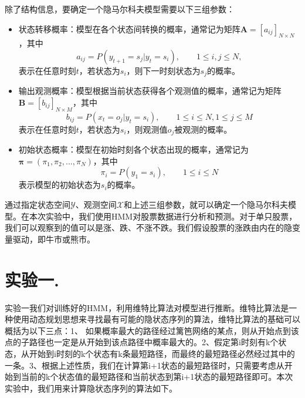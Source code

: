 \documentclass[a4paper,UTF8]{article}
\theoremstyle{definition}
\begin{document}
	除了结构信息，要确定一个隐马尔科夫模型需要以下三组参数：
\begin{itemize}
\item
	状态转移概率：模型在各个状态间转换的概率，通常记为矩阵$\textbf{A}=[a_{ij}]_{N\times N}$，其中
\begin{displaymath}
	a_{ij}=P(y_{t+1}=s_j|y_t=s_i),\qquad 1 \leq i,j \leq N,
\end{displaymath}
表示在任意时刻$t$，若状态为$s_i$，则下一时刻状态为$s_j$的概率。
\item
	输出观测概率：模型根据当前状态获得各个观测值的概率，通常记为矩阵$\textbf{B}=[b_{ij}]_{N\times M}$，其中
\begin{displaymath}
	b_{ij}=P(x_t=o_j|y_t=s_i),\qquad 1 \leq i \leq N, 1\leq j \leq M
\end{displaymath}
表示在任意时刻$t$，若状态为$s_i$，则观测值$o_j$被观测的概率。
\item
     初始状态概率：模型在初始时刻各个状态出现的概率，通常记为$\boldsymbol{\pi}=(\pi_1,\pi_2,...,\pi_N)$，其中
\begin{displaymath}
	\pi_i=P(y_1=s_i),\qquad 1\leq i \leq N
\end{displaymath}
表示模型的初始状态为$s_i$的概率。
\end{itemize}

	通过指定状态空间$\mathcal{Y}$、观测空间$\mathcal{X}$和上述三组参数，就可以确定一个隐马尔科夫模型。在本次实验中，我们使用HMM对股票数据进行分析和预测。对于单只股票，我们可以观察到的值可以是涨、跌、不涨不跌。我们假设股票的涨跌由内在的隐变量驱动，即牛市或熊市。

\section*{实验一.}
	实验一我们对训练好的HMM，利用维特比算法对模型进行推断。维特比算法是一种使用动态规划思想来寻找最有可能的隐状态序列的算法，维特比算法的基础可以概括为以下三点\cite{reference2}：1、 如果概率最大的路径经过篱笆网络的某点，则从开始点到该点的子路径也一定是从开始到该点路径中概率最大的。2、假定第i时刻有k个状态，从开始到i时刻的k个状态有k条最短路径，而最终的最短路径必然经过其中的一条。3、根据上述性质，我们在计算第i+1状态的最短路径时，只需要考虑从开始到当前的k个状态值的最短路径和当前状态到第i+1状态的最短路径即可。本次实验中，我们用来计算隐状态序列的算法如下。
\end{document}
